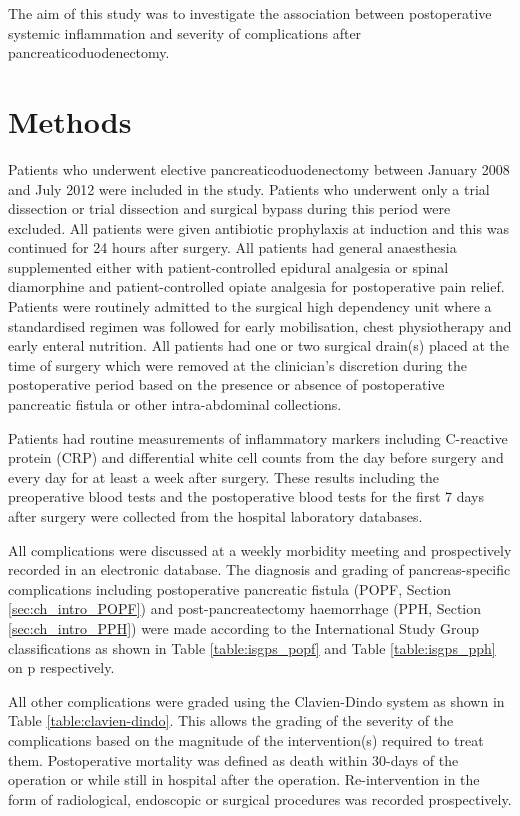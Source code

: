 The aim of this study was to investigate the association between postoperative systemic inflammation and severity of complications after pancreaticoduodenectomy.

\section{Methods}
Patients who underwent elective pancreaticoduodenectomy between January 2008 and July 2012 were included in the study. Patients who underwent only a trial dissection or trial dissection and surgical bypass during this period were excluded. All patients were given antibiotic prophylaxis at induction and this was continued for 24 hours after surgery. All patients had general anaesthesia supplemented either with patient-controlled epidural analgesia or spinal diamorphine and patient-controlled opiate analgesia for postoperative pain relief. Patients were routinely admitted to the surgical high dependency unit where a standardised regimen was followed for early mobilisation, chest physiotherapy and early enteral nutrition. All patients had one or two surgical drain(s) placed at the time of surgery which were removed at the clinician's discretion during the postoperative period based on the presence or absence of postoperative pancreatic fistula or other intra-abdominal collections. 

Patients had routine measurements of inflammatory markers including C-reactive protein (CRP) and differential white cell counts from the day before surgery and every day for at least a week after surgery. These results including the preoperative blood tests and the postoperative blood tests for the first 7 days after surgery were collected from the hospital laboratory databases.

All complications were discussed at a weekly morbidity meeting and prospectively recorded in an electronic database.  The diagnosis and grading of pancreas-specific complications including postoperative pancreatic fistula (POPF, Section \ref{sec:ch_intro_POPF}) and post-pancreatectomy haemorrhage (PPH, Section \ref{sec:ch_intro_PPH}) were made according to the International Study Group classifications as shown in Table \ref{table:isgps_popf} and Table \ref{table:isgps_pph} on p\pageref{table:isgps_popf} respectively.

All other complications were graded using the Clavien-Dindo system as shown in Table \ref{table:clavien-dindo}. This allows the grading of the severity of the complications based on the magnitude of the intervention(s) required to treat them. Postoperative mortality was defined as death within 30-days of the operation or while still in hospital after the operation. Re-intervention in the form of radiological, endoscopic or surgical procedures was recorded prospectively.

